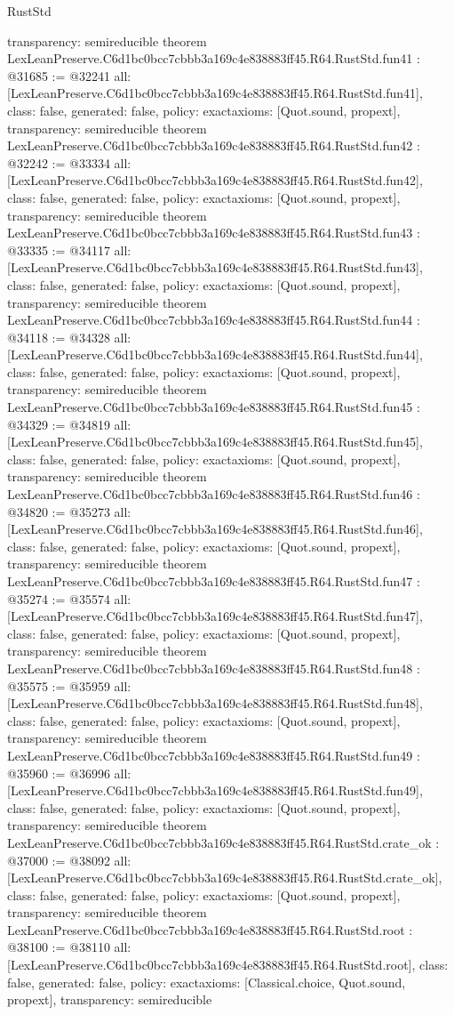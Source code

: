 \begin{lexlean}{RustStd}
\begin{coremodule}
{  transparency: semireducible
}
theorem LexLeanPreserve.C6d1bc0bcc7cbbb3a169c4e838883ff45.R64.RustStd.fun41 : @31685 := @32241 {
  all: [LexLeanPreserve.C6d1bc0bcc7cbbb3a169c4e838883ff45.R64.RustStd.fun41],
  class: false,
  generated: false,
  policy: exact{axioms: [Quot.sound, propext]},
  transparency: semireducible
}
theorem LexLeanPreserve.C6d1bc0bcc7cbbb3a169c4e838883ff45.R64.RustStd.fun42 : @32242 := @33334 {
  all: [LexLeanPreserve.C6d1bc0bcc7cbbb3a169c4e838883ff45.R64.RustStd.fun42],
  class: false,
  generated: false,
  policy: exact{axioms: [Quot.sound, propext]},
  transparency: semireducible
}
theorem LexLeanPreserve.C6d1bc0bcc7cbbb3a169c4e838883ff45.R64.RustStd.fun43 : @33335 := @34117 {
  all: [LexLeanPreserve.C6d1bc0bcc7cbbb3a169c4e838883ff45.R64.RustStd.fun43],
  class: false,
  generated: false,
  policy: exact{axioms: [Quot.sound, propext]},
  transparency: semireducible
}
theorem LexLeanPreserve.C6d1bc0bcc7cbbb3a169c4e838883ff45.R64.RustStd.fun44 : @34118 := @34328 {
  all: [LexLeanPreserve.C6d1bc0bcc7cbbb3a169c4e838883ff45.R64.RustStd.fun44],
  class: false,
  generated: false,
  policy: exact{axioms: [Quot.sound, propext]},
  transparency: semireducible
}
theorem LexLeanPreserve.C6d1bc0bcc7cbbb3a169c4e838883ff45.R64.RustStd.fun45 : @34329 := @34819 {
  all: [LexLeanPreserve.C6d1bc0bcc7cbbb3a169c4e838883ff45.R64.RustStd.fun45],
  class: false,
  generated: false,
  policy: exact{axioms: [Quot.sound, propext]},
  transparency: semireducible
}
theorem LexLeanPreserve.C6d1bc0bcc7cbbb3a169c4e838883ff45.R64.RustStd.fun46 : @34820 := @35273 {
  all: [LexLeanPreserve.C6d1bc0bcc7cbbb3a169c4e838883ff45.R64.RustStd.fun46],
  class: false,
  generated: false,
  policy: exact{axioms: [Quot.sound, propext]},
  transparency: semireducible
}
theorem LexLeanPreserve.C6d1bc0bcc7cbbb3a169c4e838883ff45.R64.RustStd.fun47 : @35274 := @35574 {
  all: [LexLeanPreserve.C6d1bc0bcc7cbbb3a169c4e838883ff45.R64.RustStd.fun47],
  class: false,
  generated: false,
  policy: exact{axioms: [Quot.sound, propext]},
  transparency: semireducible
}
theorem LexLeanPreserve.C6d1bc0bcc7cbbb3a169c4e838883ff45.R64.RustStd.fun48 : @35575 := @35959 {
  all: [LexLeanPreserve.C6d1bc0bcc7cbbb3a169c4e838883ff45.R64.RustStd.fun48],
  class: false,
  generated: false,
  policy: exact{axioms: [Quot.sound, propext]},
  transparency: semireducible
}
theorem LexLeanPreserve.C6d1bc0bcc7cbbb3a169c4e838883ff45.R64.RustStd.fun49 : @35960 := @36996 {
  all: [LexLeanPreserve.C6d1bc0bcc7cbbb3a169c4e838883ff45.R64.RustStd.fun49],
  class: false,
  generated: false,
  policy: exact{axioms: [Quot.sound, propext]},
  transparency: semireducible
}
theorem LexLeanPreserve.C6d1bc0bcc7cbbb3a169c4e838883ff45.R64.RustStd.crate_ok : @37000 := @38092 {
  all: [LexLeanPreserve.C6d1bc0bcc7cbbb3a169c4e838883ff45.R64.RustStd.crate_ok],
  class: false,
  generated: false,
  policy: exact{axioms: [Quot.sound, propext]},
  transparency: semireducible
}
theorem LexLeanPreserve.C6d1bc0bcc7cbbb3a169c4e838883ff45.R64.RustStd.root : @38100 := @38110 {
  all: [LexLeanPreserve.C6d1bc0bcc7cbbb3a169c4e838883ff45.R64.RustStd.root],
  class: false,
  generated: false,
  policy: exact{axioms: [Classical.choice, Quot.sound, propext]},
  transparency: semireducible
}


\end{coremodule}
\end{lexlean}
